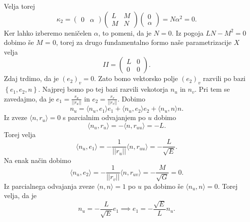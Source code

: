 Velja torej \begin{equation*}
  \kappa_2 = \begin{pmatrix}
      0 & \alpha
  \end{pmatrix} \begin{pmatrix}
  L & M \\
  M & N
  \end{pmatrix} \begin{pmatrix}
    0 \\ \alpha
  \end{pmatrix} = N \alpha^2 = 0.
\end{equation*}
Ker lahko izberemo neničelen $\alpha$, to pomeni, da je $N = 0.$ Iz pogoja $LN - M^2 = 0$ dobimo še $M$ = 0, torej za drugo fundamentalno formo naše parametrizacije $X$ velja \begin{equation*}
II = \begin{pmatrix}
L & 0 \\
0 & 0
\end{pmatrix}.
\end{equation*}  
Zdaj trdimo, da je $(e_2)_v = 0$. Zato bomo vektorsko polje $(e_2)_v$ razvili po bazi $\left\{ e_1, e_2, n\right\}$. Najprej bomo po tej bazi
razvili vekotorja $n_u$ in $n_v$. Pri tem se zavedajmo, da je $e_1 = \frac{r_u}{\lvert\lvert r_u \rvert\rvert }$ in $e_2 = \frac{r_v}{\lvert\lvert r_v \rvert\rvert }$.
Dobimo \begin{equation*}
n_u = \langle n_u, e_1 \rangle e_1 + \langle n_u, e_2 \rangle e_2 + \langle n_u, n \rangle n. 
\end{equation*}  
Iz zveze $\langle n, r_u \rangle = 0$ s parcialnim odvajanjem po $u$ dobimo \begin{equation*}
  \langle n_u, r_u \rangle = - \langle n, r_{uu} \rangle  = -L.
\end{equation*}  
Torej velja \begin{equation*}
\langle n_u, e_1 \rangle = -\frac{1}{\lvert\lvert r_u \rvert\rvert } \langle n, r_{uu} \rangle = -\frac{L}{\sqrt{E}}.   
\end{equation*}  
Na enak način dobimo \begin{equation*}
\langle n_u, e_2 \rangle = -\frac{1}{\lvert\lvert r_v \rvert\rvert } \langle n, r_{uv} \rangle = -\frac{M}{\sqrt{G}} = 0.
\end{equation*}  
Iz parcialnega odvajanja zveze $\langle n, n \rangle = 1$ po $u$ pa dobimo še $\langle n_u, n \rangle = 0$. Torej velja, da je \begin{equation*}
n_u = -\frac{L}{\sqrt{E}} e_1 \implies e_1 =-\frac{\sqrt{E} }{L} n_u.
\end{equation*}  
